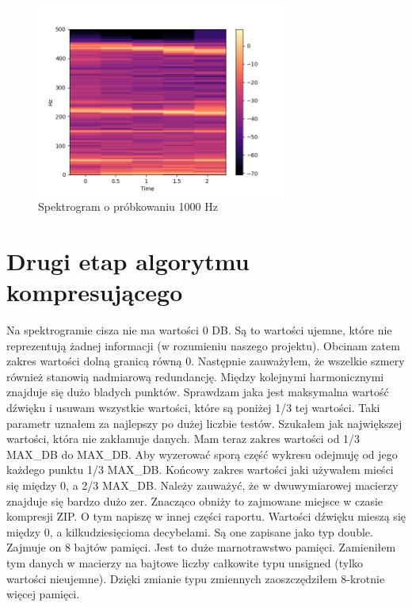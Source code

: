 \documentclass[a4paper,12pt]{extarticle}
\begin{document}
\begin{figure}[h!]
\centering
\includegraphics[width=0.75\textwidth]{spec-sr-1000}
\caption{Spektrogram o próbkowaniu 1000 Hz}
\end{figure}

\clearpage

\section*{Drugi etap algorytmu kompresującego}

Na spektrogramie cisza nie ma wartości 0 DB. Są to wartości ujemne, które nie reprezentują żadnej informacji (w rozumieniu naszego projektu). Obcinam zatem zakres wartości dolną granicą równą 0. Następnie zauważyłem, że wszelkie szmery również stanowią nadmiarową redundancję. Między kolejnymi harmonicznymi znajduje się dużo bladych punktów. Sprawdzam jaka jest maksymalna wartość dźwięku i usuwam wszystkie wartości, które są poniżej 1/3 tej wartości. Taki parametr uznałem za najlepszy po dużej liczbie testów. Szukałem jak największej wartości, która nie zakłamuje danych. Mam teraz zakres wartości od 1/3 MAX\_DB do MAX\_DB. Aby wyzerować sporą część wykresu odejmuję od jego każdego punktu 1/3 MAX\_DB. Końcowy zakres wartości jaki używałem mieści się między 0, a 2/3 MAX\_DB. Należy zauważyć, że w dwuwymiarowej macierzy znajduje się bardzo dużo zer. Znacząco obniży to zajmowane miejsce w czasie kompresji ZIP. O tym napiszę w innej części raportu. Wartości dźwięku mieszą się między 0, a kilkudziesięcioma decybelami. Są one zapisane jako typ double. Zajmuje on 8 bajtów pamięci. Jest to duże marnotrawstwo pamięci. Zamieniłem tym danych w macierzy na bajtowe liczby całkowite typu unsigned (tylko wartości nieujemne). Dzięki zmianie typu zmiennych zaoszczędziłem 8-krotnie więcej pamięci.
\end{document}
